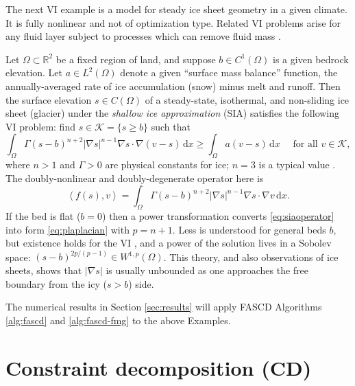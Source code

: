 \documentclass[review,hidelinks,onefignum,onetabnum]{siamart220329}
\newcommand{\RR}{\mathbb{R}}
\newcommand{\grad}{\nabla}
\newcommand{\ip}[2]{\left<#1,#2\right>}
\newcommand{\dx}{\, \mathrm{d}x}
\begin{document}
The next VI example is a model for steady ice sheet geometry in a given climate.  It is fully nonlinear and not of optimization type.  Related VI problems arise for any fluid layer subject to processes which can remove fluid mass \cite{Bueler2021conservation}.

\begin{example}  \label{ex:sia}  Let $\Omega \subset \RR^2$ be a fixed region of land, and suppose $b \in C^1(\Omega)$ is a given bedrock elevation.  Let $a \in L^2(\Omega)$ denote a given ``surface mass balance'' function, the annually-averaged rate of ice accumulation (snow) minus melt and runoff.  Then the surface elevation $s\in C(\Omega)$ of a steady-state, isothermal, and non-sliding ice sheet (glacier) under the \emph{shallow ice approximation} (SIA) \cite{GreveBlatter2009} satisfies the following VI problem: find $s \in \mathcal{K} = \{s\ge b\}$ such that
\begin{equation}
\int_\Omega \Gamma (s-b)^{n+2} |\grad s|^{n-1} \grad s \cdot \grad (v-s) \dx \ge \int_\Omega a (v-s)\dx \quad \text{ for all } v \in \mathcal{K}, \label{eq:siavi}
\end{equation}
where $n>1$ and $\Gamma>0$ are physical constants for ice; $n=3$ is a typical value \cite{GreveBlatter2009}.  The doubly-nonlinear and doubly-degenerate operator here is
\begin{equation}
\ip{f(s)}{v} = \int_\Omega \Gamma (s-b)^{n+2} |\grad s|^{n-1} \grad s \cdot \grad v\dx. \label{eq:siaoperator}
\end{equation}
If the bed is flat ($b=0$) then a power transformation converts \eqref{eq:siaoperator} into form \eqref{eq:plaplacian} with $p=n+1$.  Less is understood for general beds $b$, but existence holds for the VI \cite{JouvetBueler2012}, and a power of the solution lives in a Sobolev space: $(s-b)^{2p/(p-1)} \in W^{1,p}(\Omega)$.  This theory, and also observations of ice sheets, shows that $|\grad s|$ is usually unbounded as one approaches the free boundary from the icy ($s>b$) side.
\end{example}

The numerical results in Section \ref{sec:results} will apply FASCD Algorithms \ref{alg:fascd} and \ref{alg:fascd-fmg} to the above Examples.


\section{Constraint decomposition (CD)} \label{sec:cd}
\end{document}
